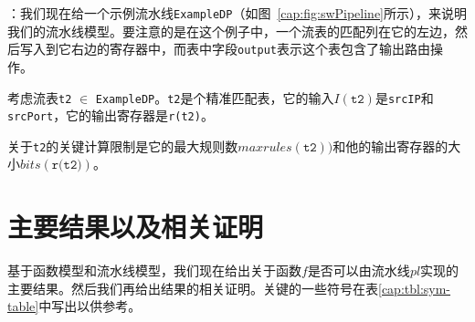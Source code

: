 \documentclass{ctexart}
\newcommand{\exampledp}{\texttt{ExampleDP}}
\newcommand{\para}[1]{\smallskip\noindent {\bf #1}}
\begin{document}
\para{示例}：我们现在给一个示例流水线\exampledp（如图~\ref{cap:fig:swPipeline}所示），来说明我们的流水线模型。要注意的是在这个例子中，一个流表的匹配列在它的左边，然后写入到它右边的寄存器中，而表中字段\texttt{output}表示这个表包含了输出路由操作。




考虑流表\texttt{t2} $\in$ \exampledp。\texttt{t2}是个精准匹配表，它的输入$I(\texttt{t2})$是\texttt{srcIP}和\texttt{srcPort}，它的输出寄存器是\texttt{r(t2)}。

关于\texttt{t2}的关键计算限制是它的最大规则数$maxrules(\texttt{t2}))$和他的输出寄存器的大小$bits(\texttt{r(t2)})$。









\section{主要结果以及相关证明}
\label{sec:main-results}

基于函数模型和流水线模型，我们现在给出关于函数$f$是否可以由流水线$pl$实现的主要结果。然后我们再给出结果的相关证明。关键的一些符号在表\ref{cap:tbl:sym-table}中写出以供参考。
\end{document}

